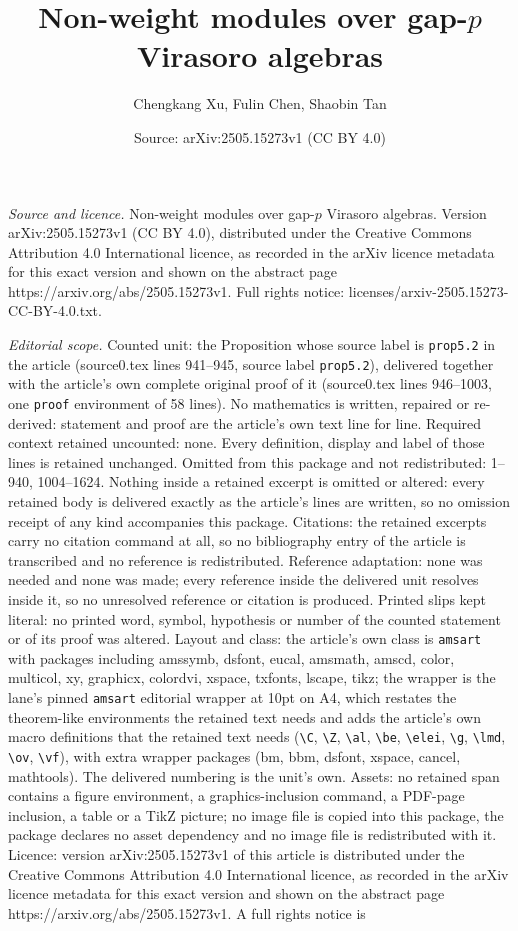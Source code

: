 \documentclass[10pt,a4paper]{amsart}
\title[Non-weight modules over gap-$p$ Virasoro algebras]{Non-weight modules over gap-$p$ Virasoro algebras}
\author{Chengkang Xu, Fulin Chen, Shaobin Tan}
\date{Source: arXiv:2505.15273v1 (CC BY 4.0)}
\begin{document}
\maketitle

\noindent\emph{Source and licence.} Non-weight modules over gap-$p$ Virasoro algebras. Version arXiv:2505.15273v1 (CC BY 4.0), distributed under the Creative Commons Attribution 4.0 International licence, as recorded in the arXiv licence metadata for this exact version and shown on the abstract page https://arxiv.org/abs/2505.15273v1. Full rights notice: licenses/arxiv-2505.15273-CC-BY-4.0.txt.\par\smallskip

\noindent\textit{Editorial scope.} Counted unit: the Proposition whose source label is \texttt{prop5.2} in the article (source0.tex lines 941--945, source label \texttt{prop5.2}), delivered together with the article's own complete original proof of it (source0.tex lines 946--1003, one \texttt{proof} environment of 58 lines). No mathematics is written, repaired or re-derived: statement and proof are the article's own text line for line. Required context retained uncounted: none. Every definition, display and label of those lines is retained unchanged. Omitted from this package and not redistributed: 1--940, 1004--1624. Nothing inside a retained excerpt is omitted or altered: every retained body is delivered exactly as the article's lines are written, so no omission receipt of any kind accompanies this package. Citations: the retained excerpts carry no citation command at all, so no bibliography entry of the article is transcribed and no reference is redistributed. Reference adaptation: none was needed and none was made; every reference inside the delivered unit resolves inside it, so no unresolved reference or citation is produced. Printed slips kept literal: no printed word, symbol, hypothesis or number of the counted statement or of its proof was altered. Layout and class: the article's own class is \texttt{amsart} with packages including amssymb, dsfont, eucal, amsmath, amscd, color, multicol, xy, graphicx, colordvi, xspace, txfonts, lscape, tikz; the wrapper is the lane's pinned \texttt{amsart} editorial wrapper at 10pt on A4, which restates the theorem-like environments the retained text needs and adds the article's own macro definitions that the retained text needs (\texttt{\textbackslash C}, \texttt{\textbackslash Z}, \texttt{\textbackslash al}, \texttt{\textbackslash be}, \texttt{\textbackslash elei}, \texttt{\textbackslash g}, \texttt{\textbackslash lmd}, \texttt{\textbackslash ov}, \texttt{\textbackslash vf}), with extra wrapper packages (bm, bbm, dsfont, xspace, cancel, mathtools). The delivered numbering is the unit's own. Assets: no retained span contains a figure environment, a graphics-inclusion command, a PDF-page inclusion, a table or a TikZ picture; no image file is copied into this package, the package declares no asset dependency and no image file is redistributed with it. Licence: version arXiv:2505.15273v1 of this article is distributed under the Creative Commons Attribution 4.0 International licence, as recorded in the arXiv licence metadata for this exact version and shown on the abstract page https://arxiv.org/abs/2505.15273v1. A full rights notice is 
\end{document}
